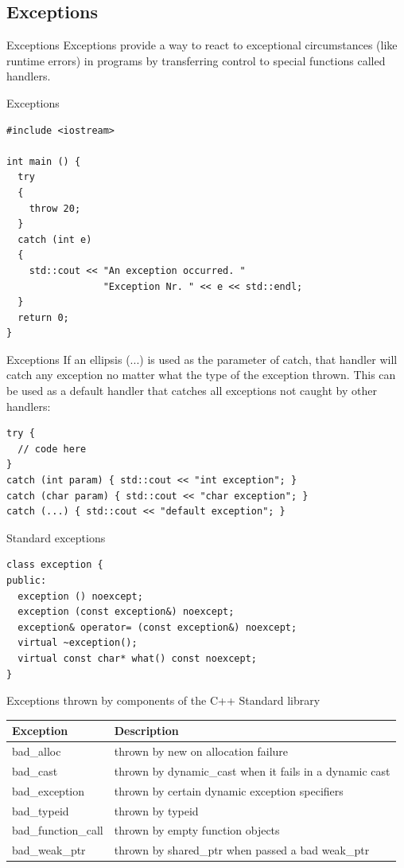 \documentclass{beamer}
\begin{document}
\subsection{Exceptions}
\begin{frame}{Exceptions}
Exceptions provide a way to react to exceptional circumstances (like runtime
errors) in programs by transferring control to special functions called
handlers. 
\end{frame}

\begin{frame}[fragile]{Exceptions}
\begin{lstlisting}
#include <iostream>

int main () {
  try
  {
    throw 20;
  }
  catch (int e)
  {
    std::cout << "An exception occurred. "
                 "Exception Nr. " << e << std::endl;
  }
  return 0;
}
\end{lstlisting}
\end{frame}

\begin{frame}[fragile]{Exceptions}
If an ellipsis (...) is used as the parameter of catch, that handler will catch
any exception no matter what the type of the exception thrown. This can be used
as a default handler that catches all exceptions not caught by other handlers:
\begin{lstlisting}
try {
  // code here
}
catch (int param) { std::cout << "int exception"; }
catch (char param) { std::cout << "char exception"; }
catch (...) { std::cout << "default exception"; }
\end{lstlisting}
\end{frame}

\begin{frame}[fragile]{Standard exceptions}
\begin{lstlisting}
class exception {
public:
  exception () noexcept;
  exception (const exception&) noexcept;
  exception& operator= (const exception&) noexcept;
  virtual ~exception();
  virtual const char* what() const noexcept;
}
\end{lstlisting}
\end{frame}

\begin{frame}{Exceptions thrown by components of the C++ Standard library}
\begin{table}
\begin{tabular}{l | l }
Exception & Description \\
\hline
bad\_alloc & thrown by new on allocation failure \\
bad\_cast & thrown by dynamic\_cast when it fails in a dynamic cast \\
bad\_exception & thrown by certain dynamic exception specifiers \\
bad\_typeid & thrown by typeid \\
bad\_function\_call & thrown by empty function objects \\
bad\_weak\_ptr & thrown by shared\_ptr when passed a bad weak\_ptr
\end{tabular}
\end{table}
\end{frame}
\end{document}

